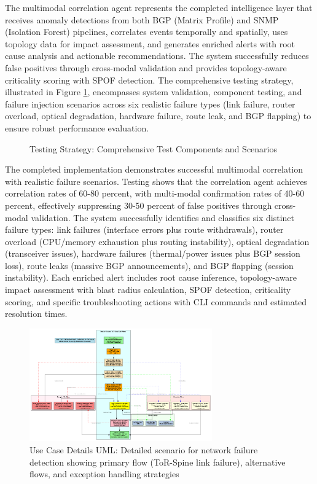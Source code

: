 \documentclass[11pt]{article}
\begin{document}
The multimodal correlation agent represents the completed intelligence layer that receives anomaly detections from both BGP (Matrix Profile) and SNMP (Isolation Forest) pipelines, correlates events temporally and spatially, uses topology data for impact assessment, and generates enriched alerts with root cause analysis and actionable recommendations. The system successfully reduces false positives through cross-modal validation and provides topology-aware criticality scoring with SPOF detection. The comprehensive testing strategy, illustrated in Figure \ref{fig:testing}, encompasses system validation, component testing, and failure injection scenarios across six realistic failure types (link failure, router overload, optical degradation, hardware failure, route leak, and BGP flapping) to ensure robust performance evaluation.

\begin{figure}[h]
\centering

\caption{Testing Strategy: Comprehensive Test Components and Scenarios}
\label{fig:testing}
\end{figure}

The completed implementation demonstrates successful multimodal correlation with realistic failure scenarios. Testing shows that the correlation agent achieves correlation rates of 60-80 percent, with multi-modal confirmation rates of 40-60 percent, effectively suppressing 30-50 percent of false positives through cross-modal validation. The system successfully identifies and classifies six distinct failure types: link failures (interface errors plus route withdrawals), router overload (CPU/memory exhaustion plus routing instability), optical degradation (transceiver issues), hardware failures (thermal/power issues plus BGP session loss), route leaks (massive BGP announcements), and BGP flapping (session instability). Each enriched alert includes root cause inference, topology-aware impact assessment with blast radius calculation, SPOF detection, criticality scoring, and specific troubleshooting actions with CLI commands and estimated resolution times.

\begin{figure}[h]
\centering
\includegraphics[width=0.7\textwidth]{usecase_details.png}
\caption{Use Case Details UML: Detailed scenario for network failure detection showing primary flow (ToR-Spine link failure), alternative flows, and exception handling strategies}
\label{fig:usecase}
\end{figure}
\end{document}

